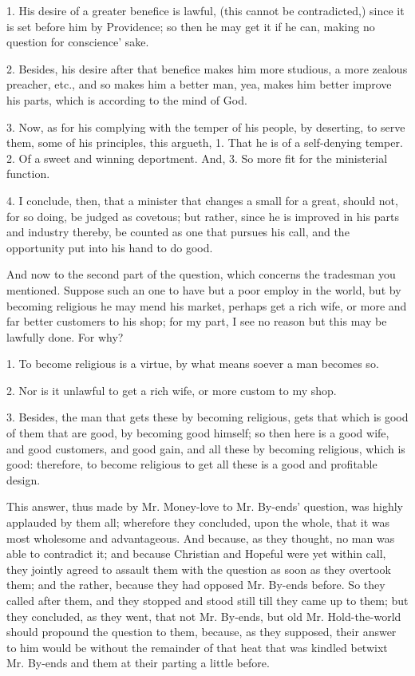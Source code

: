 1. His desire of a greater benefice is lawful, (this cannot be contradicted,) since it is set before him by Providence; so then he may get it if he can, making no question for conscience' sake.

2. Besides, his desire after that benefice makes him more studious, a more zealous preacher, etc., and so makes him a better man, yea, makes him better improve his parts, which is according to the mind of God.

3. Now, as for his complying with the temper of his people, by deserting, to serve them, some of his principles, this argueth, 1. That he is of a self-denying temper. 2. Of a sweet and winning deportment. And, 3. So more fit for the ministerial function.

4. I conclude, then, that a minister that changes a small for a great, should not, for so doing, be judged as covetous; but rather, since he is improved in his parts and industry thereby, be counted as one that pursues his call, and the opportunity put into his hand to do good.

And now to the second part of the question, which concerns the tradesman you mentioned. Suppose such an one to have but a poor employ in the world, but by becoming religious he may mend his market, perhaps get a rich wife, or more and far better customers to his shop; for my part, I see no reason but this may be lawfully done. For why?

1. To become religious is a virtue, by what means soever a man becomes so.

2. Nor is it unlawful to get a rich wife, or more custom to my shop.

3. Besides, the man that gets these by becoming religious, gets that which is good of them that are good, by becoming good himself; so then here is a good wife, and good customers, and good gain, and all these by becoming religious, which is good: therefore, to become religious to get all these is a good and profitable design.

This answer, thus made by Mr. Money-love to Mr. By-ends' question, was highly applauded by them all; wherefore they concluded, upon the whole, that it was most wholesome and advantageous. And because, as they thought, no man was able to contradict it; and because Christian and Hopeful were yet within call, they jointly agreed to assault them with the question as soon as they overtook them; and the rather, because they had opposed Mr. By-ends before. So they called after them, and they stopped and stood still till they came up to them; but they concluded, as they went, that not Mr. By-ends, but old Mr. Hold-the-world should propound the question to them, because, as they supposed, their answer to him would be without the remainder of that heat that was kindled betwixt Mr. By-ends and them at their parting a little before.

